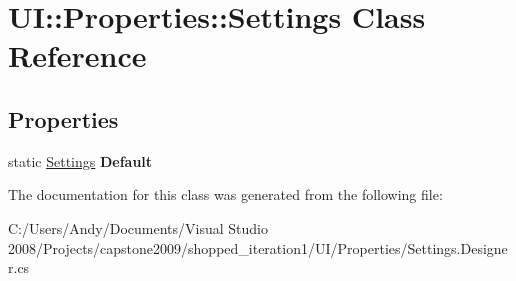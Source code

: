\hypertarget{class_u_i_1_1_properties_1_1_settings}{
\section{UI::Properties::Settings Class Reference}
\label{class_u_i_1_1_properties_1_1_settings}
}
\subsection*{Properties}
\begin{DoxyCompactItemize}
\item 
\hypertarget{class_u_i_1_1_properties_1_1_settings_a15a0e6993e5dd68352a2c6f989ad5943}{
static \hyperlink{class_u_i_1_1_properties_1_1_settings}{Settings} {\bfseries Default}}
\label{class_u_i_1_1_properties_1_1_settings_a15a0e6993e5dd68352a2c6f989ad5943}

\end{DoxyCompactItemize}


The documentation for this class was generated from the following file:\begin{DoxyCompactItemize}
\item 
C:/Users/Andy/Documents/Visual Studio 2008/Projects/capstone2009/shopped\_\-iteration1/UI/Properties/Settings.Designer.cs\end{DoxyCompactItemize}
